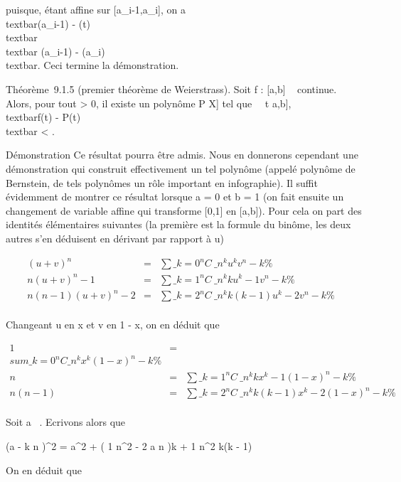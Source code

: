 \documentclass[]{article}
\begin{document}
puisque, \phi étant affine sur {[}a\_i-1,a\_i{]}, on a
\\textbar{}\phi(a\_i-1) -
\phi(t)\\textbar{} \leq\\textbar{}
\phi(a\_i-1) - \phi(a\_i)\\textbar{}. Ceci
termine la démonstration.

Théorème~9.1.5 (premier théorème de Weierstrass). Soit f : {[}a,b{]} \rightarrow~ 
continue. Alors, pour tout \epsilon \textgreater{} 0, il existe un polynôme P \in
\mathbb{C}{[}X{]} tel que \forall~~t \in {[}a,b{]},
\\textbar{}f(t) - P(t)\\textbar{}
\textless{} \epsilon.

Démonstration Ce résultat pourra être admis. Nous en donnerons cependant
une démonstration qui construit effectivement un tel polynôme (appelé
polynôme de Bernstein, de tels polynômes \jmathouent un rôle important en
infographie). Il suffit évidemment de montrer ce résultat lorsque a = 0
et b = 1 (on fait ensuite un changement de variable affine qui
transforme {[}0,1{]} en {[}a,b{]}). Pour cela on part des identités
élémentaires suivantes (la première est la formule du binôme, les deux
autres s'en déduisent en dérivant par rapport à u)

\begin{align*} (u + v)^n& =&
\sum \_k=0^nC~\_
n^ku^kv^n-k \%&
\\ n(u + v)^n-1& =&
\sum \_k=1^nC~\_
n^kku^k-1v^n-k \%&
\\ n(n - 1)(u + v)^n-2& =&
\sum \_k=2^nC~\_
n^kk(k - 1)u^k-2v^n-k\%&
\\ \end{align*}

Changeant u en x et v en 1 - x, on en déduit que

\begin{align*} 1& =& \\sum
\_k=0^nC\_ n^kx^k(1 -
x)^n-k \%& \\ n& =&
\sum \_k=1^nC~\_
n^kkx^k-1(1 - x)^n-k \%&
\\ n(n - 1)& =&
\sum \_k=2^nC~\_
n^kk(k - 1)x^k-2(1 - x)^n-k\%&
\\ \end{align*}

Soit a \in {}~. Ecrivons alors que

 \left (a - k \over n
\right )^2 = a^2 + ( 1
\over n^2 - 2 a \over n
)k + 1 \over n^2 k(k - 1)

On en déduit que
\end{document}
